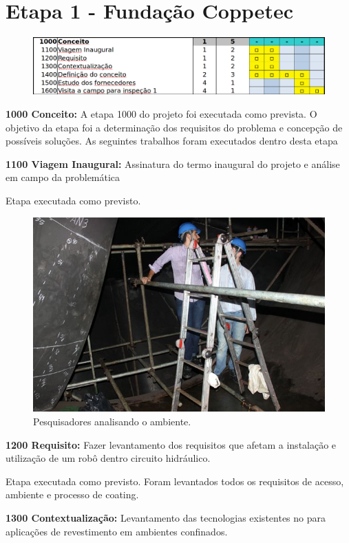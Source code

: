 

\section{Etapa 1 - Fundação Coppetec}

\begin{figure}[H]
\centering
\includegraphics[width=0.9\columnwidth]{figs/etapa1_completo}
\end{figure} 

\textbf{1000 Conceito:} A etapa 1000 do projeto foi executada como prevista. O
objetivo da etapa foi a determinação dos requisitos do problema e concepção de
possíveis soluções. As seguintes trabalhos foram executados dentro desta etapa

\noindent
\textbf{1100 Viagem Inaugural:} Assinatura do termo inaugural do projeto e
análise em campo da problemática

Etapa executada como previsto. 

\begin{figure}[H]
\centering
\includegraphics[width=0.6\columnwidth]{figs/img_4967}
\caption{Pesquisadores analisando o ambiente.}
\end{figure}

\noindent
\textbf{1200 Requisito:} Fazer levantamento dos requisitos que afetam a
instalação e utilização de um robô dentro circuito hidráulico.

Etapa executada como previsto. Foram levantados todos os requisitos de acesso,
ambiente e processo de coating.

\noindent
\textbf{1300 Contextualização:} Levantamento das tecnologias existentes no para
aplicações de revestimento em ambientes confinados.

